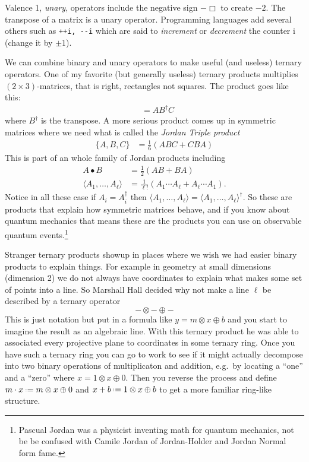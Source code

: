 Valence 1, \emph{unary}, operators include the negative sign $-\Box$ to create 
$-2$.  The transpose of a matrix is a unary operator.  Programming languages add several others 
such as \lstinline{++i, --i} which are said to \emph{increment} 
or \emph{decrement} the counter i (change it by $\pm 1$).


We can combine binary and unary operators to make useful (and useless) ternary 
operators.  One of my favorite (but generally useless) ternary products multiplies $(2\times 3)$-matrices,
that is right, rectangles not squares.  The product goes like this:
\begin{align*}
    [A,B,C] & = AB^{\dagger}C
\end{align*}
where $B^{\dagger}$ is the transpose.  A more serious product comes up 
in symmetric matrices where we need what is called the \emph{Jordan Triple product}
\begin{align*}
    \{A,B,C\} & = \frac{1}{6}(ABC+CBA)
\end{align*}
This is part of an whole family of Jordan products including 
\begin{align*}
    A\bullet B & = \frac{1}{2}(AB+BA)\\
    \langle A_1,\ldots,A_{\ell}\rangle & = \frac{1}{\ell!}(A_1\cdots A_{\ell}+A_{\ell}\cdots A_1).
\end{align*}
Notice in all these case if $A_i=A_i^{\dagger}$ then $\langle A_1,\ldots,A_{\ell}\rangle=
\langle A_1,\ldots,A_{\ell}\rangle^{\dagger}$.  So these are products that explain how 
symmetric matrices behave, and if you know about quantum mechanics that means these 
are the products you can use on observable quantum events.\footnote{Pascual Jordan was a physicist inventing 
math for quantum mechanics, not be be confused with Camile Jordan of Jordan-Holder and Jordan Normal form fame.}

Stranger ternary products showup in places where we wish we had easier binary products 
to explain things.  For example in geometry at small dimensions (dimension 2) we do not always 
have coordinates to explain what makes some set of points into a line. So Marshall Hall 
decided why not make a line $\ell$ be described by a ternary operator
\[
    -\otimes-\oplus -
\]
This is just notation but put in a formula like $y=m\otimes x\oplus b$ and you start to imagine 
the result as an algebraic line.  With this ternary product he was able to associated every 
projective plane to coordinates in some ternary ring.  Once you have such a ternary ring you 
can go to work to see if it might actually decompose into two binary operations of multiplicaton 
and addition, e.g.\ by locating a ``one'' and a ``zero'' where $x=1\otimes x\oplus 0$.  Then 
you reverse the process and define $m\cdot x\defeq m\otimes x\oplus 0$ and $x+b\defeq 1\otimes x\oplus b$
to get a more familiar ring-like structure.

